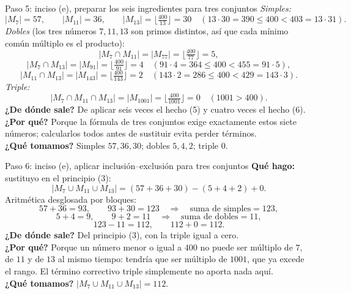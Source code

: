 \documentclass[11pt]{article}
\begin{document}
\begin{sol}
\begin{paso}{Paso 5: inciso (e), preparar los seis ingredientes para tres conjuntos}
\emph{Simples:}
\[
|M_7| = 57, \qquad |M_{11}| = 36, \qquad |M_{13}| = \Big\lfloor \tfrac{400}{13}\Big\rfloor = 30 \quad (13\cdot 30 = 390 \le 400 < 403 = 13\cdot 31).
\]
\emph{Dobles} (los tres n\'umeros $7,11,13$ son primos distintos, as\'i que cada m\'inimo com\'un m\'ultiplo es el producto):
\[
|M_7\cap M_{11}| = |M_{77}| = \Big\lfloor \tfrac{400}{77}\Big\rfloor = 5,
\]
\[
|M_7\cap M_{13}| = |M_{91}| = \Big\lfloor \tfrac{400}{91}\Big\rfloor = 4 \quad (91\cdot 4 = 364 \le 400 < 455 = 91\cdot 5),
\]
\[
|M_{11}\cap M_{13}| = |M_{143}| = \Big\lfloor \tfrac{400}{143}\Big\rfloor = 2 \quad (143\cdot 2 = 286 \le 400 < 429 = 143\cdot 3).
\]
\emph{Triple:}
\[
|M_7\cap M_{11}\cap M_{13}| = |M_{1001}| = \Big\lfloor \tfrac{400}{1001}\Big\rfloor = 0 \quad (1001 > 400).
\]
\textbf{¿De d\'onde sale?} De aplicar seis veces el hecho (5) y cuatro veces el hecho (6).\\
\textbf{¿Por qu\'e?} Porque la f\'ormula de tres conjuntos exige exactamente estos siete n\'umeros; calcularlos todos antes de sustituir evita perder t\'erminos.\\
\textbf{¿Qu\'e tomamos?} Simples $57,36,30$; dobles $5,4,2$; triple $0$.
\end{paso}

\begin{paso}{Paso 6: inciso (e), aplicar inclusi\'on--exclusi\'on para tres conjuntos}
\textbf{Qu\'e hago:} sustituyo en el principio (3):
\[
|M_7\cup M_{11}\cup M_{13}| = (57+36+30) - (5+4+2) + 0 .
\]
Aritm\'etica desglosada por bloques:
\[
57+36 = 93, \qquad 93+30 = 123 \quad\Longrightarrow\quad \text{suma de simples} = 123,
\]
\[
5+4 = 9, \qquad 9+2 = 11 \quad\Longrightarrow\quad \text{suma de dobles} = 11,
\]
\[
123 - 11 = 112, \qquad 112 + 0 = 112.
\]
\textbf{¿De d\'onde sale?} Del principio (3), con la triple igual a cero.\\
\textbf{¿Por qu\'e?} Porque un n\'umero menor o igual a $400$ no puede ser m\'ultiplo de $7$, de $11$ y de $13$ al mismo tiempo: tendr\'ia que ser m\'ultiplo de $1001$, que ya excede el rango. El t\'ermino correctivo triple simplemente no aporta nada aqu\'i.\\
\textbf{¿Qu\'e tomamos?} $|M_7\cup M_{11}\cup M_{13}| = 112$.
\end{paso}


\end{sol}
\end{document}
